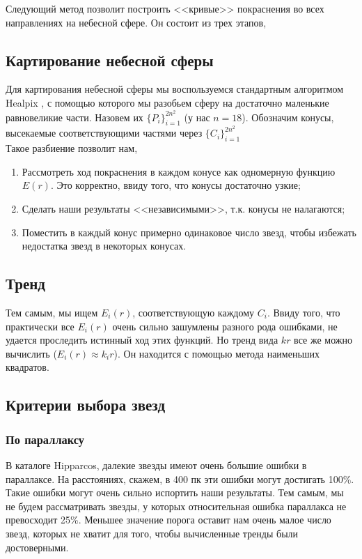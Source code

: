 \documentclass[14pt]{article}
\begin{document}
        Следующий метод позволит построить <<кривые>> покраснения во всех направлениях на небесной сфере. Он состоит из трех этапов,
        \subsection{Картирование небесной сферы}
            Для картирования небесной сферы мы воспользуемся стандартным алгоритмом Healpix \cite{healpix}, с помощью которого мы разобьем сферу на достаточно маленькие равновеликие части. Назовем их $\{P_i\}_{i = 1}^{2n^2}$ (у нас $n = 18$). Обозначим конусы, высекаемые соответствующими частями через $\{C_i\}_{i = 1}^{2n^2}$\\
			Такое разбиение позволит нам,
            \begin{enumerate}
                \item Рассмотреть ход покраснения в каждом конусе как одномерную функцию $E(r)$. Это корректно, ввиду того, что конусы достаточно узкие;
                \item Сделать наши результаты <<независимыми>>, т.к. конусы не налагаются;
                \item Поместить в каждый конус примерно одинаковое число звезд, чтобы избежать недостатка звезд в некоторых конусах.  
            \end{enumerate}  
		  
	   \subsection{Тренд}
            Тем самым, мы ищем $E_i(r)$, соответствующую каждому $C_i$. Ввиду того, что практически все $E_i(r)$ очень сильно зашумлены разного рода ошибками, не удается проследить истинный ход этих функций. Но тренд вида $k r$ все же можно вычислить ($E_i(r) \approx k_i r$). Он находится с помощью метода наименьших квадратов.  
            
        \subsection{Критерии выбора звезд}
            \subsubsection{По параллаксу}
                В каталоге Hipparcos, далекие звезды имеют очень большие ошибки в параллаксе. На расстояниях, скажем, в 400 пк эти ошибки могут достигать 100\%. Такие ошибки могут очень сильно испортить наши результаты. Тем самым, мы не будем рассматривать звезды, у которых относительная ошибка параллакса не превосходит 25\%. Меньшее значение порога оставит нам очень малое число звезд, которых не хватит для того, чтобы вычисленные тренды были достоверными.
\end{document}
